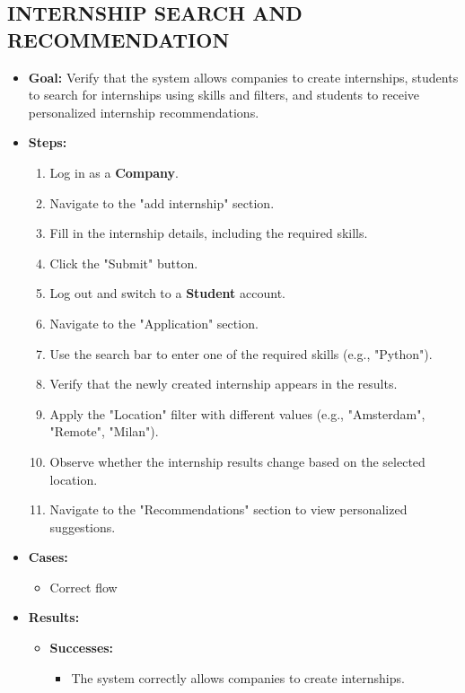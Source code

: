 \subsection{INTERNSHIP SEARCH AND RECOMMENDATION}\label{subsec:internship-search-and-recommendation}
\begin{itemize}
    \item \textbf{Goal:} Verify that the system allows companies to create internships, students to search for internships using skills and filters, and students to receive personalized internship recommendations.

    \item \textbf{Steps:}
    \begin{enumerate}
        \item Log in as a \textbf{Company}.
        \item Navigate to the "add internship" section.
        \item Fill in the internship details, including the required skills.
        \item Click the "Submit" button.
        \item Log out and switch to a \textbf{Student} account.
        \item Navigate to the "Application" section.
        \item Use the search bar to enter one of the required skills (e.g., "Python").
        \item Verify that the newly created internship appears in the results.
        \item Apply the "Location" filter with different values (e.g., "Amsterdam", "Remote", "Milan").
        \item Observe whether the internship results change based on the selected location.
        \item Navigate to the "Recommendations" section to view personalized suggestions.
    \end{enumerate}
    \item \textbf{Cases:}
    \begin{itemize}
        \item Correct flow
    \end{itemize}
    \item \textbf{Results:}
    \begin{itemize}
        \item \textbf{Successes:}
        \begin{itemize}
            \item The system correctly allows companies to create internships.

\end{itemize}
\end{itemize}
\end{itemize}
